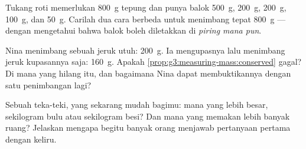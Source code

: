 \begin{exercise}[$\star$]\label{exo:g3:measuring-mass:9}
Tukang roti memerlukan \qty{800}{g} tepung dan punya balok
\qty{500}{g}, \qty{200}{g}, \qty{200}{g}, \qty{100}{g}, dan
\qty{50}{g}. Carilah dua cara berbeda untuk menimbang tepat
\qty{800}{g} --- dengan mengetahui bahwa balok boleh diletakkan di
\emph{piring mana pun}.
\end{exercise}

\begin{exercise}[$\star\star$]\label{exo:g3:measuring-mass:10}
Nina menimbang sebuah jeruk utuh: \qty{200}{g}. Ia mengupasnya lalu
menimbang jeruk kupasannya saja: \qty{160}{g}. Apakah
\cref{prop:g3:measuring-mass:conserved} gagal? Di mana  yang
hilang itu, dan bagaimana Nina dapat membuktikannya dengan satu
penimbangan lagi?
\end{exercise}

\begin{exercise}[$\star\star$]\label{exo:g3:measuring-mass:11}
Sebuah teka-teki, yang sekarang mudah bagimu: mana yang  lebih
besar, sekilogram bulu atau sekilogram besi? Dan mana yang memakan
lebih banyak ruang? Jelaskan mengapa begitu banyak orang menjawab
pertanyaan pertama dengan keliru.
\end{exercise}
